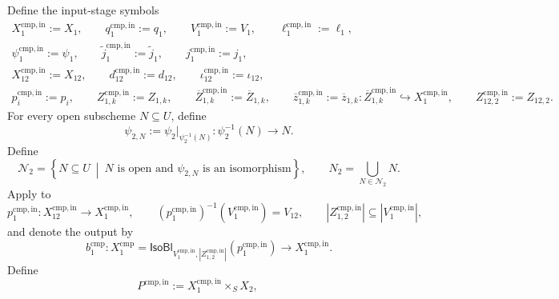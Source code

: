 \begin{definition}
  \label{def:nagata-two-open-improved-comparison}

  Define the input-stage symbols
  \[
  \begin{gathered}
    X_1^{\mathrm{cmp,in}}:=X_1,\qquad
    q_1^{\mathrm{cmp,in}}:=q_1,\qquad
    V_1^{\mathrm{cmp,in}}:=V_1,\qquad
    \ell_1^{\mathrm{cmp,in}}:=\ell_1,\\
    \psi_1^{\mathrm{cmp,in}}:=\psi_1,\qquad
    \widetilde j_1^{\mathrm{cmp,in}}:=\widetilde j_1,\qquad
    j_1^{\mathrm{cmp,in}}:=j_1,\\
    X_{12}^{\mathrm{cmp,in}}:=X_{12},\qquad
    d_{12}^{\mathrm{cmp,in}}:=d_{12},\qquad
    \iota_{12}^{\mathrm{cmp,in}}:=\iota_{12},\\
    p_i^{\mathrm{cmp,in}}:=p_i,\qquad
    Z_{1,k}^{\mathrm{cmp,in}}:=Z_{1,k},\qquad
    \overline Z_{1,k}^{\mathrm{cmp,in}}:=\overline Z_{1,k},\qquad
    \overline z_{1,k}^{\mathrm{cmp,in}}:=\overline z_{1,k}\colon
      \overline Z_{1,k}^{\mathrm{cmp,in}}
        \hookrightarrow X_1^{\mathrm{cmp,in}},\qquad
    Z_{12,2}^{\mathrm{cmp,in}}:=Z_{12,2}.
  \end{gathered}                                                   \tag{CMP0}
  \]
  For every open subscheme $N\subseteq U$, define
  \[
    \psi_{2,N}:=\psi_2|_{\psi_2^{-1}(N)}\colon
      \psi_2^{-1}(N)\longrightarrow N.
  \]
  Define
  \[
    \mathscr N_2
      =\left\{
          N\subseteq U\ \middle|\
          N\text{ is open and }\psi_{2,N}
          \text{ is an isomorphism}
        \right\},
    \qquad
    N_2=\bigcup_{N\in\mathscr N_2}N.
  \]
  Apply  to
  \[
    p_1^{\mathrm{cmp,in}}\colon X_{12}^{\mathrm{cmp,in}}
      \to X_1^{\mathrm{cmp,in}},\qquad
    (p_1^{\mathrm{cmp,in}})^{-1}(V_1^{\mathrm{cmp,in}})=V_{12},\qquad
    |Z_{1,2}^{\mathrm{cmp,in}}|\subseteq|V_1^{\mathrm{cmp,in}}|,
  \]
  and denote the output by
  \[
    b_1^{\mathrm{cmp}}\colon
      X_1^{\mathrm{cmp}}
      =\mathsf{IsoBl}_{V_1^{\mathrm{cmp,in}},
        |Z_{1,2}^{\mathrm{cmp,in}}|}(p_1^{\mathrm{cmp,in}})
      \longrightarrow X_1^{\mathrm{cmp,in}}.                     \tag{C1}
  \]
  Define
  \[
    P^{\mathrm{cmp,in}}:=X_1^{\mathrm{cmp,in}}\times_SX_2,\qquad
\]
\end{definition}
